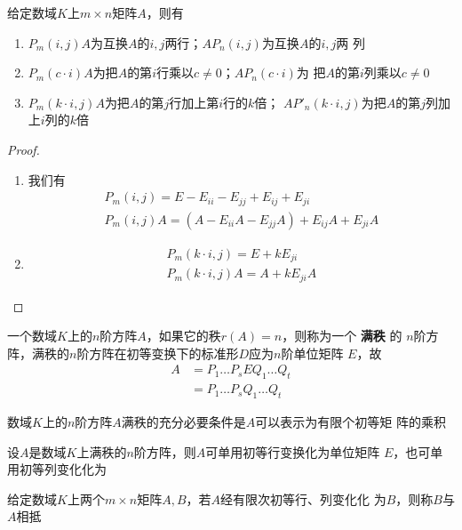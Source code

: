 \documentclass[11pt]{article}
\begin{document}
\begin{proposition}[]
给定数域\(K\)上\(m\times n\)矩阵\(A\)，则有
\begin{enumerate}
\item \(P_m(i,j)A\)为互换\(A\)的\(i,j\)两行；\(AP_n(i,j)\)为互换\(A\)的\(i,j\)两
列
\item \(P_m(c\cdot i)A\)为把\(A\)的第\(i\)行乘以\(c\neq0\)；\(AP_n(c\cdot i)\)为
把\(A\)的第\(i\)列乘以\(c\neq0\)
\item \(P_m(k\cdot i,j)A\)为把\(A\)的第\(j\)行加上第\(i\)行的\(k\)倍；
\(AP'_n(k\cdot i,j)\)为把\(A\)的第\(j\)列加上\(i\)列的\(k\)倍
\end{enumerate}
\end{proposition}

\begin{proof}
\begin{enumerate}
\item 我们有
\begin{gather*}
P_m(i,j)=E-E_{ii}-E_{jj}+E_{ij}+E_{ji}\\
P_m(i,j)A=(A-E_{ii}A-E_{jj}A)+E_{ij}A+E_{ji}A
\end{gather*}
\setcounter{enumi}{2}
\item \begin{gather*}
P_m(k\cdot i,j)=E+kE_{ji}\\
P_m(k\cdot i,j)A=A+kE_{ji}A
\end{gather*}
\end{enumerate}
\end{proof}

一个数域\(K\)上的\(n\)阶方阵\(A\)，如果它的秩\(r(A)=n\)，则称为一个 \textbf{满秩} 的
\(n\)阶方阵，满秩的\(n\)阶方阵在初等变换下的标准形\(D\)应为\(n\)阶单位矩阵
\(E\)，故
\begin{align*}
A&=P_1\dots P_sEQ_1\dots Q_t\\
&=P_1\dots P_sQ_1\dots Q_t
\end{align*}

\begin{proposition}[]
数域\(K\)上的\(n\)阶方阵\(A\)满秩的充分必要条件是\(A\)可以表示为有限个初等矩
阵的乘积
\end{proposition}

\begin{corollary}[]
设\(A\)是数域\(K\)上满秩的\(n\)阶方阵，则\(A\)可单用初等行变换化为单位矩阵
\(E\)，也可单用初等列变化化为
\end{corollary}

\begin{definition}[]
给定数域\(K\)上两个\(m\times n\)矩阵\(A,B\)，若\(A\)经有限次初等行、列变化化
为\(B\)，则称\(B\)与\(A\)相抵
\end{definition}
\end{document}
